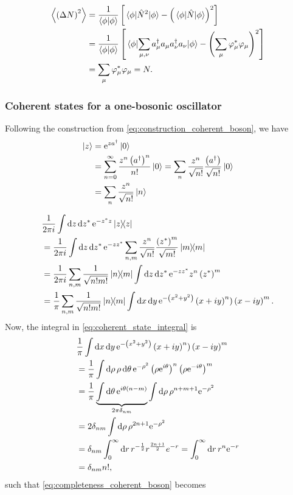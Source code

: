 \begin{align}
\ev{\left(\Delta N \right)^2} &= \frac{1}{\braket{\phi}}\left[ \ev{\hat{N}^2}{\phi} - \left( \ev{\hat{N}}{\phi}\right)^2\right] \\
&= \frac{1}{\braket{\phi}}\left[\ev{\sum_{\mu, \nu}a_\mu^\dagger a_\mu a_\nu^\dagger a_\nu}{\phi} - \left(\sum_\mu\varphi_\mu^*\varphi_\mu\right)^2\right]\\
\label{unc:expvalN2}
&= \sum_\mu\varphi_\mu^*\varphi_\mu = N.
\end{align}

\subsubsection{Coherent states for a one-bosonic oscillator}

Following the construction from \eqref{eq:construction_coherent_boson}, we have
\begin{align}
\ket{z} &= \mathrm{e}^{za^\dagger}\ket 0 \\
&= \sum_{n=0}^\infty \frac{z^n\left(a^\dagger\right)^n}{n!}\ket{0} = \sum_n \frac{z^n}{\sqrt{n!}}\frac{\left(a^\dagger\right)}{\sqrt{n!}}\ket 0 \\
&= \sum_n\frac{z^n}{\sqrt{n!}}\ket n
\end{align}

\begin{align}
\label{eq:completeness_coherent_boson}
&\frac{1}{2\pi i}\int\dd z \dd{z^*}\e^{-z^*z}\dyad z \\
&= \frac{1}{2\pi i}\int \dd z \dd{z^*}\e^{-zz^*}\sum_{n,m}\frac{z^n}{\sqrt{n!}}\frac{\left(z^*\right)^m}{\sqrt{m!}}\dyad m \\
&= \frac{1}{2\pi i}\sum_{n, m}\frac{1}{\sqrt{n!m!}}\dyad{n}{m}\int\dd z \dd{z^*}\e^{-zz^*}z^n\left(z^*\right)^m \\
&= \frac{1}{\pi}\sum_{n, m}\frac{1}{\sqrt{n!m!}}\dyad{n}{m}\int \dd{x}\dd{y} \e^{-\left(x^2 + y^2\right)}\left(x+iy\right)^n)\left(x-iy\right)^m. \label{eq:coherent_state_integral}
\end{align}
Now, the integral in \eqref{eq:coherent_state_integral} is
\begin{align}
&\frac{1}{\pi}\int\dd{x}\dd{y}\mathrm{e}^{-\left(x^2 + y^2\right)}\left(x+iy\right)^n)\left(x-iy\right)^m \nonumber \\
&= \frac{1}{\pi} \int \dd{\rho}\rho\dd{\theta}\mathrm{e}^{-\rho^2}\left(\rho\mathrm{e}^{i\theta}\right)^n\left(\rho\mathrm{e}^{-i\theta}\right)^m\nonumber \\
&= \frac{1}{\pi}\underbrace{\int\dd{\theta}\mathrm{e}^{i\theta(n-m)}}_{2\pi\delta_{nm}}\int\dd{\rho}\rho^{n+m+1}\mathrm{e}^{-\rho^2}\nonumber \\
&= 2\delta_{nm}\int\dd{\rho}\rho^{2n+1}\mathrm{e}^{-\rho^2}\nonumber\\ 
&= \delta_{nm}\int_0^\infty\dd{r}r^{-\frac{1}{2}}r^{\frac{2n+1}{2}}e^{-r} = \int_0^\infty\dd{r}r^n\mathrm{e}^{-r} \nonumber\\
&= \delta_{nm}n!,
\end{align}
such that \eqref{eq:completeness_coherent_boson} becomes

